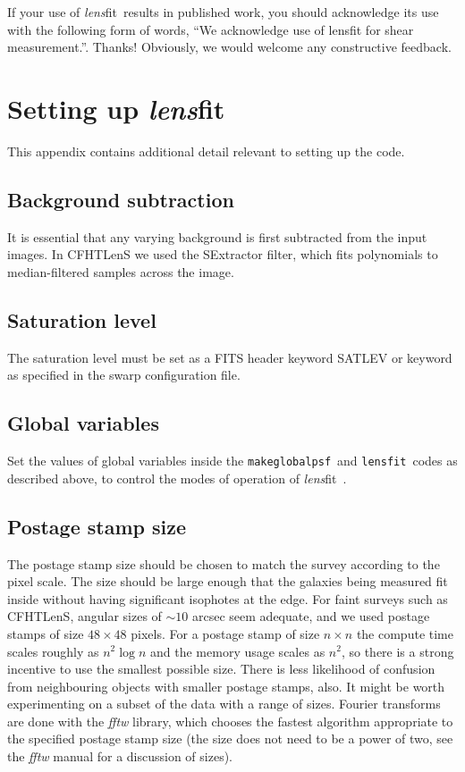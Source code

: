 \documentclass{article}
\def\lensfit{{\tt lensfit}\ }
\def\makeglobalpsf{{\tt makeglobalpsf}\ }
\def\lensfitsuite{{\em lens}fit\ }
\begin{document}
If your use of \lensfitsuite results in published work, you should acknowledge its use with
the following form of words,
``We acknowledge use of lensfit \citep{miller07a, kitching08a} for shear measurement.''.
Thanks! Obviously, we would welcome any constructive feedback.




\appendix
\section{Setting up \lensfitsuite}
This appendix contains additional detail relevant to setting up the code.

\subsection{Background subtraction}

It is essential that any varying background is first subtracted from the input images.  In CFHTLenS
we used the SExtractor filter, which fits polynomials to median-filtered samples across the image.

\subsection{Saturation level}
The saturation level must be set as a FITS header keyword SATLEV
or keyword as specified in the swarp 
configuration file. 

\subsection{Global variables}
Set the values of global variables inside the \makeglobalpsf and \lensfit codes as described
above, to control the modes of operation of \lensfitsuite.

\subsection{Postage stamp size}
The postage stamp size should be chosen to match the survey according
to the pixel scale.  The size should be large enough that the galaxies
being measured fit inside without having significant isophotes at the
edge.  For faint surveys such as CFHTLenS, angular sizes of $\sim 10$ arcsec seem adequate,
and we used postage stamps of size $48 \times 48$ pixels.
For a postage stamp of size $n \times n$ the compute time scales
roughly as $n^2 \log n$ and the memory usage scales as $n^2$, so there
is a strong incentive to use the smallest possible size.  There is
less likelihood of confusion from neighbouring objects with smaller
postage stamps, also. It might be worth experimenting on a subset of
the data with a range of sizes.  Fourier transforms are done with the {\em fftw}
library, which chooses the fastest algorithm appropriate to the specified
postage stamp size (the size does not need to be a power of two, see the {\em fftw}
manual for a discussion of sizes).  
\end{document}
